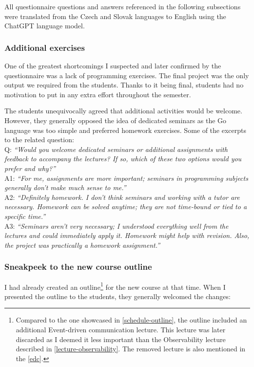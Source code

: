 \documentclass[
  digital,
  color,
  oneside,
  nosansbold,
  nocolorbold,
  lof,
  nolot,
]{fithesis4}
\begin{document}
All questionnaire questions and answers referenced in the following subsections were translated from the Czech and Slovak languages to English using the ChatGPT\cite{chatgpt} language model.

\subsubsection{Additional exercises}\label{additional-exercises}

One of the greatest shortcomings I suspected and later confirmed by the questionnaire was a lack of programming exercises. The final project was the only output we required from the students. Thanks to it being final, students had no motivation to put in any extra effort throughout the semester.

The students unequivocally agreed that additional activities would be welcome. However, they generally opposed the idea of dedicated seminars as the Go language was too simple and preferred homework exercises. Some of the excerpts to the related question: \\

\noindent
Q: \textit{\enquote{Would you welcome dedicated seminars or additional assignments with feedback to accompany the lectures? If so, which of these two options would you prefer and why?}} \\

\noindent
A1: \textit{\enquote{For me, assignments are more important; seminars in programming subjects generally don't make much sense to me.}} \\

\noindent
A2: \textit{\enquote{Definitely homework. I don't think seminars and working with a tutor are necessary. Homework can be solved anytime; they are not time-bound or tied to a specific time.}} \\

\noindent
A3: \textit{\enquote{Seminars aren't very necessary; I understood everything well from the lectures and could immediately apply it. Homework might help with revision. Also, the project was practically a homework assignment.}} \\

\subsubsection{Sneakpeek to the new course outline}\label{sneakpeek}

\noindent
I had already created an outline\footnote{Compared to the one showcased in \cref{schedule-outline}, the outline included an additional Event-driven communication lecture. This lecture was later discarded as I deemed it less important than the Observability lecture described in \cref{lecture-observability}. The removed lecture is also mentioned in the \cref{edc}.} for the new course at that time. When I presented the outline to the students, they generally welcomed the changes: \\
\end{document}
